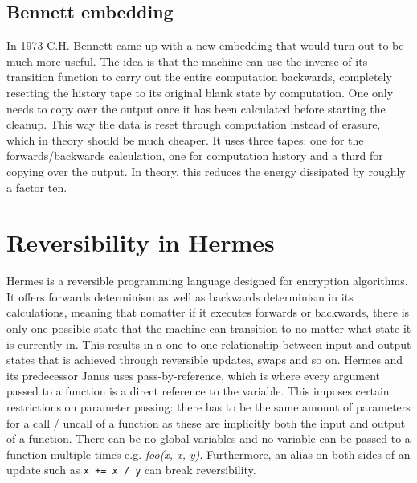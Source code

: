 \subsection{Bennett embedding}
In 1973 C.H. Bennett came up with a new embedding that would turn out to be much more useful\cite{Bennett1973LogicalRO}.
The idea is that the machine can use the inverse of its transition function to carry out the entire computation backwards, completely resetting the history tape to its original blank state by computation. One only needs to copy over the output once it has been calculated before starting the cleanup. This way the data is reset through computation instead of erasure, which in theory should be much cheaper.
It uses three tapes: one for the forwards/backwards calculation, one for computation history and a third for copying over the output. 
In theory, this reduces the energy dissipated by roughly a factor ten.

\section{Reversibility in Hermes}
Hermes is a reversible programming language designed for encryption algorithms. It offers forwards determinism as well as backwards determinism in its calculations, meaning that nomatter if it executes forwards or backwards, there is only one possible state that the machine can transition to no matter what state it is currently in.
This results in a one-to-one relationship between input and output states that is achieved through reversible updates, swaps and so on.
Hermes and its predecessor Janus uses pass-by-reference, which is where every argument passed to a function is a direct reference to the variable.
This imposes certain restrictions on parameter passing: there has to be the same amount of parameters for a call / uncall of a function as these are implicitly both the input and output of a function.
There can be no global variables and no variable can be passed to a function multiple times e.g. \emph{foo(x, x, y)}.
Furthermore, an alias on both sides of an update such as \lstinline{x += x / y} can break reversibility.

